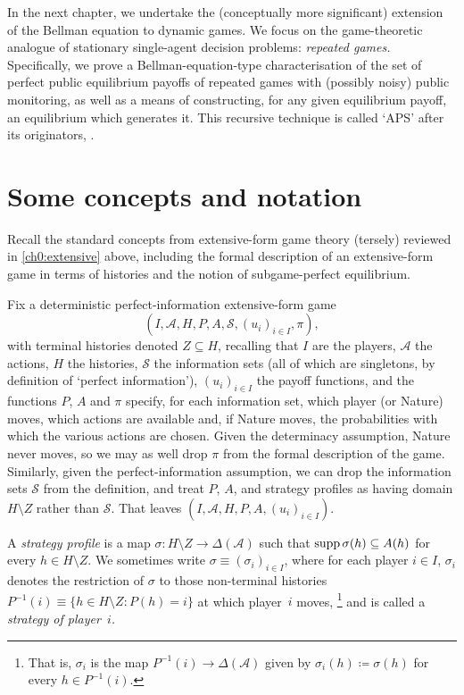 In the next chapter, we undertake the (conceptually more significant) extension of the Bellman equation to dynamic games. We focus on the game-theoretic analogue of stationary single-agent decision problems: \emph{repeated games.} Specifically, we prove a Bellman-equation-type characterisation of the set of perfect public equilibrium payoffs of repeated games with (possibly noisy) public monitoring, as well as a means of constructing, for any given equilibrium payoff, an equilibrium which generates it. This recursive technique is called `APS' after its originators, \textcite{AbreuPearceStacchetti1990}.



\section{Some concepts and notation}
\label{osdp:recap}

Recall the standard concepts from extensive-form game theory (tersely) reviewed in \cref{ch0:extensive} above, including the formal description of an extensive-form game in terms of histories and the notion of subgame-perfect equilibrium.

Fix a deterministic perfect-information extensive-form game
%
\begin{equation*}
	(I,\mathcal{A},H,P,A,\mathcal{S},(u_i)_{i \in I},\pi) ,
\end{equation*}
%
with terminal histories denoted $Z \subseteq H$, recalling that $I$ are the players, $\mathcal{A}$ the actions, $H$ the histories, $\mathcal{S}$ the information sets (all of which are singletons, by definition of `perfect information'), $(u_i)_{i \in I}$ the payoff functions, and the functions $P$, $A$ and $\pi$ specify, for each information set, which player (or Nature) moves, which actions are available and, if Nature moves, the probabilities with which the various actions are chosen.
Given the determinacy assumption, Nature never moves, so we may as well drop $\pi$ from the formal description of the game. Similarly, given the perfect-information assumption, we can drop the information sets $\mathcal{S}$ from the definition, and treat $P$, $A$, and strategy profiles as having domain $H \setminus Z$ rather than $\mathcal{S}$. That leaves $(I,\mathcal{A},H,P,A,(u_i)_{i \in I})$.

A \emph{strategy profile} is a map $\sigma : H \setminus Z \to \Delta(\mathcal{A})$ such that $\operatorname*{supp} \sigma(h) \subseteq A(h)$ for every $h \in H \setminus Z$. We sometimes write $\sigma \equiv (\sigma_i)_{i \in I}$, where for each player $i \in I$, $\sigma_i$ denotes the restriction of $\sigma$ to those non-terminal histories $P^{-1}(i) \equiv \{ h \in H \setminus Z : P(h) = i \}$ at which player~$i$ moves,%
	\footnote{That is, $\sigma_i$ is the map $P^{-1}(i) \to \Delta(\mathcal{A})$ given by $\sigma_i(h) \coloneqq \sigma(h)$ for every $h \in P^{-1}(i)$.}
and is called a \emph{strategy of player~$i$.}

